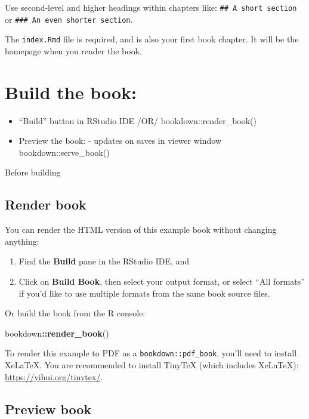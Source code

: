 \documentclass[
]{book}
\newenvironment{Shaded}{\begin{snugshade}}{\end{snugshade}}
\newcommand{\FunctionTok}[1]{\textcolor[rgb]{0.13,0.29,0.53}{\textbf{#1}}}
\newcommand{\NormalTok}[1]{#1}
\newcommand{\SpecialCharTok}[1]{\textcolor[rgb]{0.81,0.36,0.00}{\textbf{#1}}}
\providecommand{\tightlist}{%
  \setlength{\itemsep}{0pt}\setlength{\parskip}{0pt}}
\theoremstyle{definition}
\theoremstyle{definition}
\theoremstyle{definition}
\theoremstyle{definition}
\theoremstyle{remark}
\begin{document}
Use second-level and higher headings within chapters like: \texttt{\#\#\ A\ short\ section} or \texttt{\#\#\#\ An\ even\ shorter\ section}.

The \texttt{index.Rmd} file is required, and is also your first book chapter. It will be the homepage when you render the book.

\section{Build the book:}\label{build-the-book-1}

\begin{itemize}
\tightlist
\item
  ``Build'' button in RStudio IDE /OR/ bookdown::render\_book()
\item
  Preview the book: - updates on saves in viewer window bookdown::serve\_book()
\end{itemize}

Before building

\subsection{Render book}\label{render-book}

You can render the HTML version of this example book without changing anything:

\begin{enumerate}
\def\labelenumi{\arabic{enumi}.}
\item
  Find the \textbf{Build} pane in the RStudio IDE, and
\item
  Click on \textbf{Build Book}, then select your output format, or select ``All formats'' if you'd like to use multiple formats from the same book source files.
\end{enumerate}

Or build the book from the R console:

\begin{Shaded}
\begin{Highlighting}[]
\NormalTok{bookdown}\SpecialCharTok{::}\FunctionTok{render\_book}\NormalTok{()}
\end{Highlighting}
\end{Shaded}

To render this example to PDF as a \texttt{bookdown::pdf\_book}, you'll need to install XeLaTeX. You are recommended to install TinyTeX (which includes XeLaTeX): \url{https://yihui.org/tinytex/}.

\subsection{Preview book}\label{preview-book}
\end{document}
